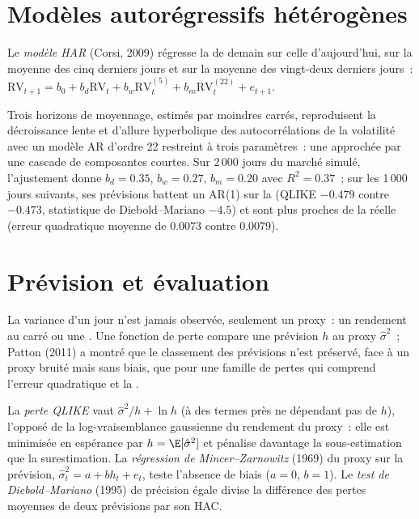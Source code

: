 \section{Modèles autorégressifs hétérogènes}

\begin{definition}\label{def:qm:volatility-models:har}
Le \emph{modèle HAR} (Corsi, 2009) régresse la  de demain sur celle d'aujourd'hui, sur la moyenne des cinq derniers jours et sur la moyenne des
vingt-deux derniers jours~: $\mathrm{RV}_{t+1} = b_0 + b_d\mathrm{RV}_t + b_w\mathrm{RV}_t^{(5)} + b_m\mathrm{RV}_t^{(22)} + e_{t+1}$.
\end{definition}

Trois horizons de moyennage, estimés par moindres carrés, reproduisent la décroissance lente et d'allure hyperbolique des autocorrélations de la volatilité avec un modèle AR d'ordre 22
restreint à trois paramètres~: une  approchée par une cascade de composantes courtes. Sur 2\,000 jours du marché simulé, l'ajustement donne $b_d = 0.35$, $b_w =
0.27$, $b_m = 0.20$ avec $R^2 = 0.37$~; sur les 1\,000 jours suivants, ses prévisions battent un AR(1) sur la  (QLIKE $-0.479$ contre $-0.473$,
statistique de Diebold--Mariano $-4.5$) et sont plus proches de la  réelle (erreur quadratique moyenne de 0.0073 contre 0.0079).

\section{Prévision et évaluation}

La variance d'un jour n'est jamais observée, seulement un proxy~: un rendement au carré ou une . Une fonction de perte compare une prévision $h$ au proxy
$\hat\sigma^2$~; Patton (2011) a montré que le classement des prévisions n'est préservé, face à un proxy bruité mais sans biais, que pour une famille de pertes qui comprend
l'erreur quadratique et la .

\begin{definition}\label{def:qm:volatility-models:eval}
La \emph{perte QLIKE} vaut $\hat\sigma^2/h + \ln h$ (à des termes près ne dépendant pas de $h$), l'opposé de la log-vraisemblance gaussienne du
rendement du proxy~: elle est minimisée en espérance par $h = \E[\hat\sigma^2]$ et pénalise davantage la sous-estimation que la surestimation. La \emph{régression de Mincer--Zarnowitz
} (1969) du proxy sur la prévision, $\hat\sigma^2_t = a + bh_t + e_t$, teste l'absence de biais ($a = 0$, $b = 1$). Le
\emph{test de Diebold--Mariano} (1995) de précision égale divise la différence des pertes moyennes de deux prévisions par son  HAC.
\end{definition}

